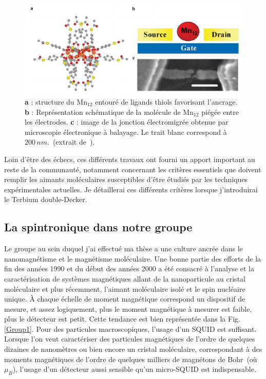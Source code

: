 \begin{figure}
\centering \includegraphics[scale=0.45]{Spintronique/MolSpintro/MolSpintro.pdf}
\caption{\textbf{a} : structure du Mn$_{12}$ entouré de ligands thiols favorisant l'ancrage. \textbf{b} : Représentation schématique de la molécule de Mn$_{12}$ piégée entre les électrodes. \textbf{c} : image de la jonction électromigrée obtenue par microscopie électronique à balayage. Le trait blanc correspond à $200\,nm$.~(extrait de~\cite{Heersche2006}).}
\label{MolSpintro}
\end{figure}

Loin d'\^etre des échecs, ces différents travaux ont fourni un apport important au reste de la communauté, notamment concernant les critères essentiels que doivent remplir les aimants moléculaires susceptibles d'être étudiés par les techniques expérimentales actuelles. Je détaillerai ces différents critères lorsque j'introduirai le Terbium double-Decker.
 
\subsection{La spintronique dans notre groupe}
Le groupe au sein duquel j'ai effectué ma thèse a une culture ancrée dans le nanomagnétisme et le magnétisme moléculaire. Une bonne partie des efforts de la fin des années 1990 et du début des années 2000 a été consacré à l'analyse et la caractérisation de systèmes magnétiques allant de la nanoparticule au cristal moléculaire  et plus récemment, l'aimant moléculaire isolé et le spin nucléaire unique. À chaque échelle de moment magnétique correspond un dispositif de mesure, et assez logiquement, plus le moment magnétique à mesurer est faible, plus le détecteur est petit. Cette tendance est bien représentée dans la Fig.\ref{Group1}. Pour des particules macroscopiques, l'usage d'un SQUID est suffisant. Lorsque l'on veut caractériser des particules magnétiques de l'ordre de quelques dizaines de nanomètres ou bien encore un cristal moléculaire, correspondant à des moments magnétiques de l'ordre de quelques milliers de magnétons de Bohr~(où $\mu_B$), l'usage d'un détecteur aussi sensible qu'un micro-SQUID est indispensable.


